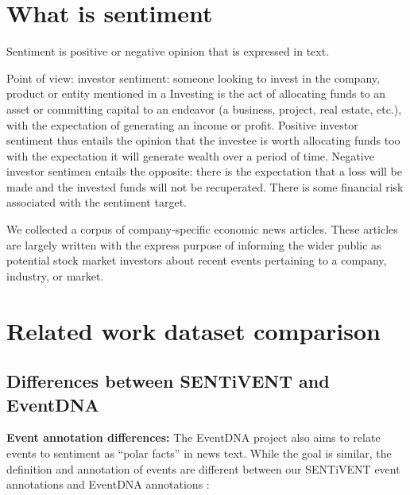 \section{What is sentiment}

Sentiment is positive or negative opinion that is expressed in text.

Point of view: investor sentiment: someone looking to invest in the company, product or entity mentioned in a 
Investing is the act of allocating funds to an asset or committing capital to an endeavor (a business, project, real estate, etc.), with the expectation of generating an income or profit. Positive investor sentiment thus entails the opinion that the investee is worth allocating funds too with the expectation it will generate wealth over a period of time.
Negative investor sentimen entails the opposite: there is the expectation that a loss will be made and the invested funds will not be recuperated. There is some financial risk associated with the sentiment target.

We collected a corpus of company-specific economic news articles.
These articles are largely written with the express purpose of informing the wider public as potential stock market investors about recent events pertaining to a company, industry, or market.

\section{Related work dataset comparison}
\subsection{Differences between SENTiVENT and EventDNA}
\textbf{Event annotation differences:} The EventDNA project \cite{colruyt2019leveraging} also aims to relate events to sentiment as ``polar facts'' in news text.
While the goal is similar, the definition and annotation of events are different between our SENTiVENT event annotations \cite{jacobs2020sentiventeventguidelines} and EventDNA annotations \cite{Colruyt2019}:

